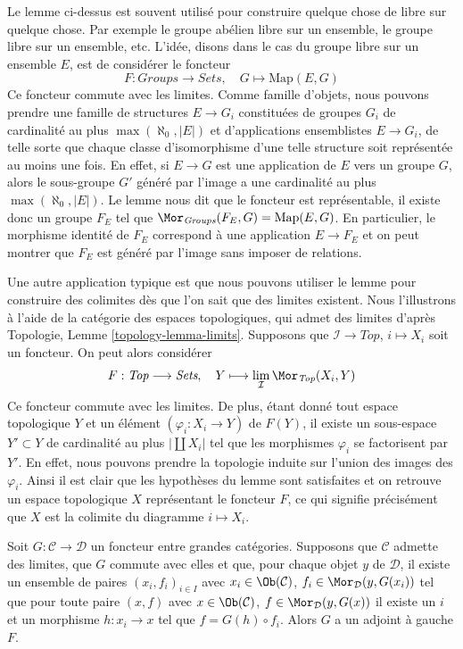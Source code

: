 \begin{remark}
\label{remark-how-to-use-it}
Le lemme ci-dessus est souvent utilisé pour construire quelque chose de libre
sur quelque chose. Par exemple le groupe abélien libre sur un ensemble, le
groupe libre sur un ensemble, etc. L'idée, disons dans le cas du groupe libre
sur un ensemble $E$, est de considérer le foncteur
$$
F : \textit{Groups} \to \textit{Sets},\quad
G \longmapsto \text{Map}(E, G)
$$
Ce foncteur commute avec les limites. Comme famille d'objets, nous pouvons
prendre une famille de structures $E \to G_i$ constituées de groupes $G_i$
de cardinalité au plus $\max(\aleph_0, |E|)$ et d'applications ensemblistes
$E \to G_i$, de telle sorte que chaque classe d'isomorphisme d'une telle
structure soit représentée
au moins une fois. En effet, si $E \to G$ est une application de $E$ vers un
groupe $G$, alors le sous-groupe $G'$ généré par l'image a une cardinalité au
plus $\max(\aleph_0, |E|)$. Le lemme nous dit que le foncteur est
représentable, il existe donc un groupe $F_E$ tel que
$\Mor_{\textit{Groups}}(F_E, G) = \text{Map}(E, G)$. En particulier, le
morphisme identité de $F_E$ correspond à une application $E \to F_E$ et on
peut montrer que $F_E$ est généré par l'image sans imposer de relations.

\medskip\noindent
Une autre application typique est que nous pouvons utiliser le lemme pour
construire des colimites dès que l'on sait que des limites existent. Nous
l'illustrons à l'aide de la catégorie des espaces topologiques, qui admet des
limites d'après Topologie, Lemme \ref{topology-lemma-limits}. Supposons
que $\mathcal{I} \to \textit{Top}$, $i \mapsto X_i$ soit un foncteur. On peut
alors considérer
$$
F : \textit{Top} \longrightarrow \textit{Sets},\quad
Y \longmapsto \lim_\mathcal{I} \Mor_{\textit{Top}}(X_i, Y)
$$
Ce foncteur commute avec les limites. De plus, étant donné tout espace
topologique $Y$ et un élément $(\varphi_i : X_i \to Y)$ de $F(Y)$, il existe
un sous-espace $Y' \subset Y$ de cardinalité au plus $|\coprod X_i|$ tel que
les morphismes $\varphi_i$ se factorisent par $Y'$. En effet, nous pouvons prendre
la topologie induite sur l'union des images des $\varphi_i$. Ainsi il est clair
que les hypothèses du lemme sont satisfaites et on retrouve un espace
topologique $X$ représentant le foncteur $F$, ce qui signifie précisément que
$X$ est la colimite du diagramme $i \mapsto X_i$.
\end{remark}

\begin{theorem}
\label{theorem-adjoint-functor}
Soit $G : \mathcal{C} \to \mathcal{D}$ un foncteur entre grandes catégories.
Supposons que $\mathcal{C}$ admette des limites, que $G$ commute avec elles et que,
pour chaque objet $y$ de $\mathcal{D}$, il existe un ensemble de paires $(x_i, f_i)_{i \in I}$ avec $x_i \in \Ob(\mathcal{C})$, $f_i \in \Mor_\mathcal{D}(y, G(x_i))$ tel que pour toute paire $(x, f)$ avec $x \in \Ob(\mathcal{C})$, $f \in \Mor_\mathcal{D}(y, G(x))$ il existe un $i$ et un morphisme $h : x_i \to x$ tel que $f = G(h) \circ f_i$. Alors $G$ a un adjoint à gauche $F$.
\end{theorem}

